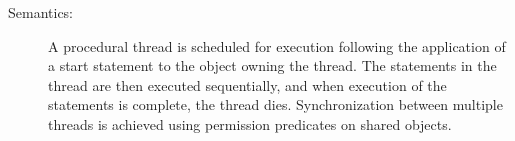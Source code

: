 \documentclass[\pformat,12pt]{article}
\begin{document}
\begin{description}
\item[Semantics:] \mbox{} 
A procedural thread is scheduled for execution following the
application of a start statement to the object owning the thread. The
statements in the thread are then executed sequentially, and when
execution of the statements is complete, the thread
dies. Synchronization between multiple threads is achieved using
permission predicates on shared objects.
%
%
%
%

\end{description}
\end{document}
